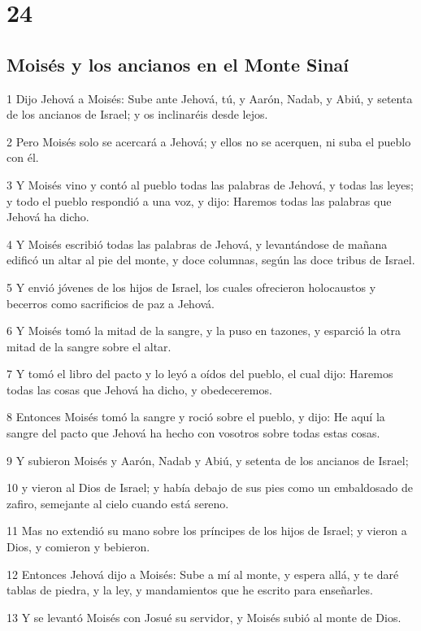 \chapter{24}

\section*{Moisés y los ancianos en el Monte Sinaí}

\par 1 Dijo Jehová a Moisés: Sube ante Jehová, tú, y Aarón, Nadab, y Abiú, y setenta de los ancianos de Israel; y os inclinaréis desde lejos.
\par 2 Pero Moisés solo se acercará a Jehová; y ellos no se acerquen, ni suba el pueblo con él.
\par 3 Y Moisés vino y contó al pueblo todas las palabras de Jehová, y todas las leyes; y todo el pueblo respondió a una voz, y dijo: Haremos todas las palabras que Jehová ha dicho.
\par 4 Y Moisés escribió todas las palabras de Jehová, y levantándose de mañana edificó un altar al pie del monte, y doce columnas, según las doce tribus de Israel.
\par 5 Y envió jóvenes de los hijos de Israel, los cuales ofrecieron holocaustos y becerros como sacrificios de paz a Jehová.
\par 6 Y Moisés tomó la mitad de la sangre, y la puso en tazones, y esparció la otra mitad de la sangre sobre el altar.
\par 7 Y tomó el libro del pacto y lo leyó a oídos del pueblo, el cual dijo: Haremos todas las cosas que Jehová ha dicho, y obedeceremos.
\par 8 Entonces Moisés tomó la sangre y roció sobre el pueblo, y dijo: He aquí la sangre del pacto que Jehová ha hecho con vosotros sobre todas estas cosas.
\par 9 Y subieron Moisés y Aarón, Nadab y Abiú, y setenta de los ancianos de Israel;
\par 10 y vieron al Dios de Israel; y había debajo de sus pies como un embaldosado de zafiro, semejante al cielo cuando está sereno.
\par 11 Mas no extendió su mano sobre los príncipes de los hijos de Israel; y vieron a Dios, y comieron y bebieron.
\par 12 Entonces Jehová dijo a Moisés: Sube a mí al monte, y espera allá, y te daré tablas de piedra, y la ley, y mandamientos que he escrito para enseñarles.
\par 13 Y se levantó Moisés con Josué su servidor, y Moisés subió al monte de Dios.
